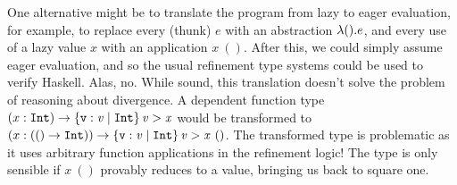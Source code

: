 
%
One alternative might be to translate the program from lazy to eager evaluation,
for example, to replace every (thunk) $e$ with an abstraction $\lambda (). e$,
and every use of a lazy value $x$ with an application $x\ ()$. 
After this, we could simply assume eager evaluation, and so the usual refinement
type systems could be used to verify Haskell. Alas, no. 
While sound, this translation
doesn't solve the problem
of reasoning about divergence. 
A dependent function type
${\tfun{x}{\tint}{\tlref{\vv}{\tint}{}{\vv>\x}}}$
would be transformed to
${\tfun{x}{(\tfunbasic{()}{\tint})}
          {\tlref{\vv}{\tint}{}{\vv > \x\ ()}}}$.
%
%
The transformed type is problematic as it uses 
arbitrary function applications in the refinement logic!
%
The type is only sensible if $x\ ()$ provably reduces to a value, 
bringing us back to square one.

